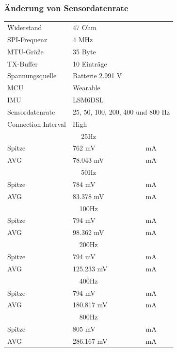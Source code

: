 \subsubsection{Änderung von Sensordatenrate}
\begin{minipage}{\linewidth}
	\label{tab:aaaaaaaaaaaaaaaa}
	\begin{tabularx}{\linewidth}{|l|l|X|}
		Widerstand & \multicolumn{2}{l|}{47 Ohm}\\
    SPI-Frequenz & \multicolumn{2}{l|}{4 MHz}\\
    MTU-Größe & \multicolumn{2}{l|}{35 Byte}\\
    TX-Buffer & \multicolumn{2}{l|}{10 Einträge}\\
    Spannungsquelle & \multicolumn{2}{l|}{Batterie 2.991 V}\\
    MCU & \multicolumn{2}{l|}{Wearable}\\
    IMU & \multicolumn{2}{l|}{LSM6DSL}\\
    Sensordatenrate & \multicolumn{2}{l|}{25, 50, 100, 200, 400 und 800 Hz}\\
    Connection Interval & \multicolumn{2}{l|}{High}\\
    \hline
    \multicolumn{3}{|c|}{25Hz}\\
    Spitze & 762 mV & mA\\
    AVG & 78.043 mV & mA\\
    \hline
    \multicolumn{3}{|c|}{50Hz}\\
    Spitze & 784 mV & mA\\
    AVG & 83.378 mV & mA\\
    \hline
    \multicolumn{3}{|c|}{100Hz}\\
    Spitze & 794 mV & mA\\
    AVG & 98.362 mV & mA\\
    \hline
    \multicolumn{3}{|c|}{200Hz}\\
    Spitze & 794 mV & mA\\
    AVG & 125.233 mV & mA\\
    \hline
    \multicolumn{3}{|c|}{400Hz}\\
    Spitze & 794 mV & mA\\
    AVG & 180.817 mV & mA\\
    \hline
    \multicolumn{3}{|c|}{800Hz}\\
    Spitze & 805 mV & mA\\
    AVG & 286.167 mV & mA\\
  \end{tabularx}
\end{minipage}\\\\


